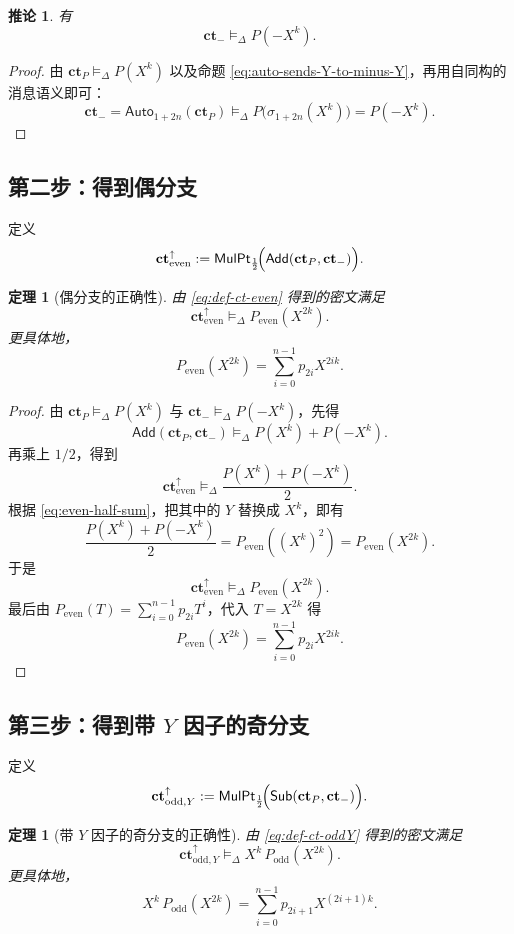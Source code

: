 \documentclass[11pt,a4paper]{ctexart}
\newcommand{\Auto}[1]{\mathsf{Auto}_{#1}}
\newcommand{\Add}{\mathsf{Add}}
\newcommand{\Sub}{\mathsf{Sub}}
\newcommand{\MulPt}[1]{\mathsf{MulPt}_{#1}}
\newcommand{\ct}{\mathbf{ct}}
\newcommand{\cte}{\mathbf{ct}_{\mathrm{even}}^{\uparrow}}
\newcommand{\ctoy}{\mathbf{ct}_{\mathrm{odd},Y}^{\uparrow}}
\newcommand{\rep}{\mathrel{\vDash_{\Delta}}}
\newtheorem{theorem}[definition]{定理}
\newtheorem{corollary}[definition]{推论}
\begin{document}
\begin{corollary}
有
\[
\ct_{-}\rep P(-X^k).
\]
\end{corollary}

\begin{proof}
由 \(\ct_P\rep P(X^k)\) 以及命题 \eqref{eq:auto-sends-Y-to-minus-Y}，再用自同构的消息语义即可：
\[
\ct_{-}
=
\Auto{1+2n}(\ct_P)
\rep
P\bigl(\sigma_{1+2n}(X^k)\bigr)
=
P(-X^k).
\]
\end{proof}

\subsection{第二步：得到偶分支}

定义
\begin{equation}
\cte
:=
\MulPt{\frac12}\!\Bigl(\Add(\ct_P,\ct_{-})\Bigr). \label{eq:def-ct-even}
\end{equation}

\begin{theorem}[偶分支的正确性]
由 \eqref{eq:def-ct-even} 得到的密文满足
\[
\cte \rep P_{\mathrm{even}}(X^{2k}).
\]
更具体地，
\[
P_{\mathrm{even}}(X^{2k})=\sum_{i=0}^{n-1}p_{2i}X^{2ik}.
\]
\end{theorem}

\begin{proof}
由 \(\ct_P\rep P(X^k)\) 与 \(\ct_{-}\rep P(-X^k)\)，先得
\[
\Add(\ct_P,\ct_{-})\rep P(X^k)+P(-X^k).
\]
再乘上 \(1/2\)，得到
\[
\cte \rep \frac{P(X^k)+P(-X^k)}{2}.
\]
根据 \eqref{eq:even-half-sum}，把其中的 \(Y\) 替换成 \(X^k\)，即有
\[
\frac{P(X^k)+P(-X^k)}{2}=P_{\mathrm{even}}((X^k)^2)=P_{\mathrm{even}}(X^{2k}).
\]
于是
\[
\cte \rep P_{\mathrm{even}}(X^{2k}).
\]
最后由 \(P_{\mathrm{even}}(T)=\sum_{i=0}^{n-1}p_{2i}T^i\)，代入 \(T=X^{2k}\) 得
\[
P_{\mathrm{even}}(X^{2k})=\sum_{i=0}^{n-1}p_{2i}X^{2ik}.
\]
\end{proof}

\subsection{第三步：得到带 \texorpdfstring{\(Y\)}{Y} 因子的奇分支}

定义
\begin{equation}
\ctoy
:=
\MulPt{\frac12}\!\Bigl(\Sub(\ct_P,\ct_{-})\Bigr). \label{eq:def-ct-oddY}
\end{equation}

\begin{theorem}[带 \(Y\) 因子的奇分支的正确性]
由 \eqref{eq:def-ct-oddY} 得到的密文满足
\[
\ctoy \rep X^k\,P_{\mathrm{odd}}(X^{2k}).
\]
更具体地，
\[
X^k\,P_{\mathrm{odd}}(X^{2k})
=
\sum_{i=0}^{n-1}p_{2i+1}X^{(2i+1)k}.
\]
\end{theorem}
\end{document}
